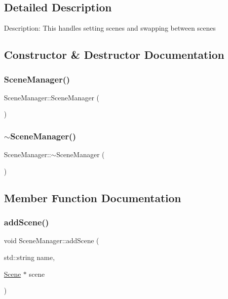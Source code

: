 \subsection{Detailed Description}
Description\+: This handles setting scenes and swapping between scenes 

\subsection{Constructor \& Destructor Documentation}
\mbox{\label{class_scene_manager_a52085e6737c23b491c228e86781af808}} 
\subsubsection{\texorpdfstring{SceneManager()}{SceneManager()}}
{\footnotesize\ttfamily Scene\+Manager\+::\+Scene\+Manager (\begin{DoxyParamCaption}{ }\end{DoxyParamCaption})}

\mbox{\label{class_scene_manager_a2bb376a85d29e85f47753e26c7539229}} 
\subsubsection{\texorpdfstring{$\sim$SceneManager()}{~SceneManager()}}
{\footnotesize\ttfamily Scene\+Manager\+::$\sim$\+Scene\+Manager (\begin{DoxyParamCaption}{ }\end{DoxyParamCaption})}



\subsection{Member Function Documentation}
\mbox{\label{class_scene_manager_acb8e176697ea223d4fd8c2718056206e}} 
\subsubsection{\texorpdfstring{addScene()}{addScene()}}
{\footnotesize\ttfamily void Scene\+Manager\+::add\+Scene (\begin{DoxyParamCaption}\item[{std\+::string}]{name,  }\item[{\mbox{\hyperlink{class_scene}{Scene}} $\ast$}]{scene }\end{DoxyParamCaption})}

